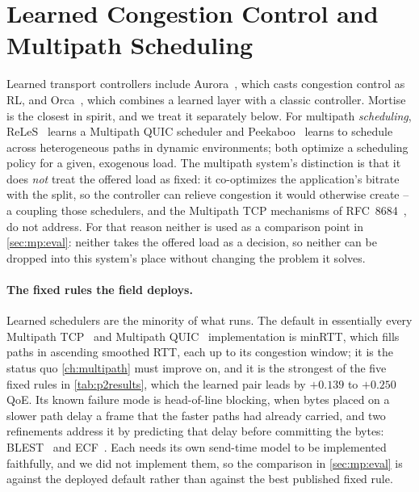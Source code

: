 \section{Learned Congestion Control and Multipath Scheduling}
\label{sec:rel:transport}

Learned transport controllers include Aurora~\cite{Jay2019}, which casts congestion control as RL, and
Orca~\cite{Abbasloo2020}, which combines a learned layer with a classic controller. Mortise~\cite{Shen2026}
is the closest in spirit, and we treat it separately below. For multipath \emph{scheduling}, ReLeS~\cite{Zhang2019} learns a
Multipath QUIC scheduler and Peekaboo~\cite{Wu2020} learns to schedule across heterogeneous paths in dynamic
environments; both optimize a scheduling policy for a given, exogenous load. The multipath system's distinction is that it
does \emph{not} treat the offered load as fixed: it co-optimizes the application's bitrate with the split, so
the controller can relieve congestion it would otherwise create -- a coupling those schedulers, and the
Multipath TCP mechanisms of RFC~8684~\cite{RFC8684}, do not address. For that reason neither is used as
a comparison point in \cref{sec:mp:eval}: neither takes the offered load as a decision, so neither can
be dropped into this system's place without changing the problem it solves.

\paragraph{The fixed rules the field deploys.} Learned schedulers are the minority of what runs. The
default in essentially every Multipath TCP~\cite{RFC8684} and Multipath QUIC~\cite{DeConinck2017}
implementation is minRTT, which fills paths in ascending smoothed RTT, each up to its congestion
window; it is the status quo \cref{ch:multipath} must improve on, and it is the strongest of the five
fixed rules in \cref{tab:p2results}, which the learned pair leads by $+0.139$ to $+0.250$ QoE. Its
known failure mode is head-of-line blocking, when bytes placed on a slower path delay a frame that the
faster paths had already carried, and two refinements address it by predicting that delay before
committing the bytes: BLEST~\cite{Ferlin2016} and ECF~\cite{Lim2017}. Each needs its own send-time
model to be implemented faithfully, and we did not implement them, so the comparison in
\cref{sec:mp:eval} is against the deployed default rather than against the best published fixed rule.

